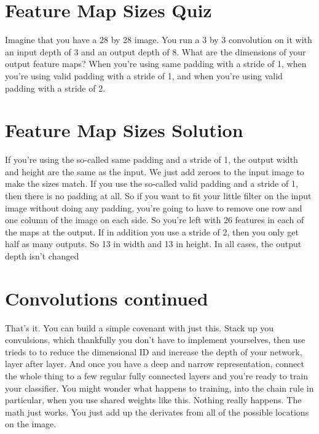 \documentclass{article}
\begin{document}
\section{Feature Map Sizes Quiz}
Imagine that you have a 28 by 28 image.
You run a 3 by 3 convolution on
it with an input depth of 3 and
an output depth of 8.
What are the dimensions of
your output feature maps?
When you're using same
padding with a stride of 1,
when you're using valid padding
with a stride of 1, and
when you're using valid
padding with a stride of 2.
\section{Feature Map Sizes Solution}
If you're using the so-called
same padding and a stride of 1,
the output width and
height are the same as the input.
We just add zeroes to the input
image to make the sizes match.
If you use the so-called valid
padding and a stride of 1,
then there is no padding at all.
So if you want to fit your little filter
on the input image without doing any
padding, you're going to
have to remove one row and
one column of the image on each side.
So you're left with 26 features in
each of the maps at the output.
If in addition you use a stride of 2,
then you only get half as many outputs.
So 13 in width and 13 in height.
In all cases,
the output depth isn't changed
\section{Convolutions continued}
That's it.
You can build a simple
covenant with just this.
Stack up you convulsions, which
thankfully you don't have to implement
yourselves, then use trieds to
to reduce the dimensional ID and
increase the depth of your network,
layer after layer.
And once you have a deep and
narrow representation,
connect the whole thing to a few
regular fully connected layers and
you're ready to train your classifier.
You might wonder what
happens to training,
into the chain rule in particular,
when you use shared weights like this.
Nothing really happens.
The math just works.
You just add up the derivates from all
of the possible locations on the image.
\end{document}
